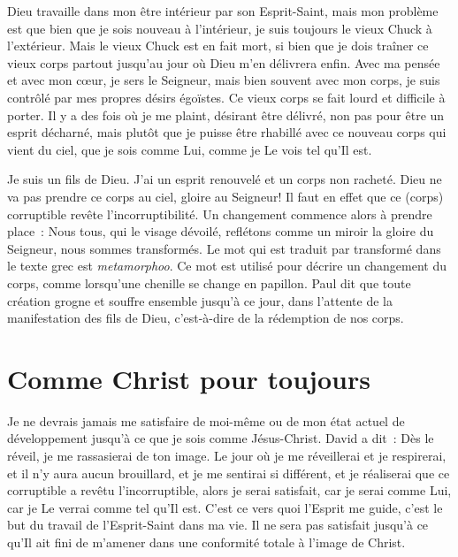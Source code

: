 Dieu travaille dans mon être intérieur par son Esprit-Saint,
 mais mon problème est que bien que je sois nouveau à l'intérieur,
 je suis toujours le vieux Chuck à l'extérieur.
 Mais le vieux Chuck est en fait mort, si bien que je dois traîner
 ce vieux corps partout jusqu'au jour où Dieu m'en délivrera enfin.
 Avec ma pensée et avec mon cœur, je sers le Seigneur,
 mais bien souvent avec mon corps,
 je suis contrôlé par mes propres désirs égoïstes.
 Ce vieux corps se fait lourd et difficile à porter.
 Il y a des fois où je me plaint, désirant être délivré,
 non pas pour être un esprit décharné, mais plutôt que je puisse
 être rhabillé avec ce nouveau corps qui vient du ciel,
 que je sois comme Lui, comme je Le vois tel qu'Il est.

Je suis un fils de Dieu. J'ai un esprit renouvelé et un corps non racheté.
 Dieu ne va pas prendre ce corps au ciel, gloire au Seigneur!
 \og Il faut en effet que ce (corps) corruptible
 revête l'incorruptibilité. \fg{}
 Un changement commence alors à prendre place~:
 \og Nous tous, qui le visage dévoilé,
 reflétons comme un miroir la gloire du Seigneur,
 nous sommes transformés. \fg{}
 Le mot qui est traduit par \og transformé \fg{}
 dans le texte grec est \emph{metamorphoo}.
 Ce mot est utilisé pour décrire un changement du corps,
 comme lorsqu'une chenille se change en papillon.
 Paul dit que toute création grogne et souffre ensemble
 jusqu'à ce jour, dans l'attente de la manifestation des fils de Dieu,
 c'est-à-dire de la rédemption de nos corps.


\section*{Comme Christ pour toujours}

Je ne devrais jamais me satisfaire de moi-même ou de mon état actuel
 de développement jusqu'à ce que je sois comme Jésus-Christ.
 David a dit~:
 \og Dès le réveil, je me rassasierai de ton image. \fg{}
 Le jour où je me réveillerai et je respirerai,
 et il n'y aura aucun brouillard, et je me sentirai si différent,
 et je réaliserai que ce corruptible a revêtu l'incorruptible,
 alors je serai satisfait, car je serai comme Lui, car je Le verrai
 comme tel qu'Il est. C'est ce vers quoi l'Esprit me guide,
 c'est le but du travail de l'Esprit-Saint dans ma vie.
 Il ne sera pas satisfait jusqu'à ce qu'Il ait fini de m'amener
 dans une conformité totale à l'image de Christ.

